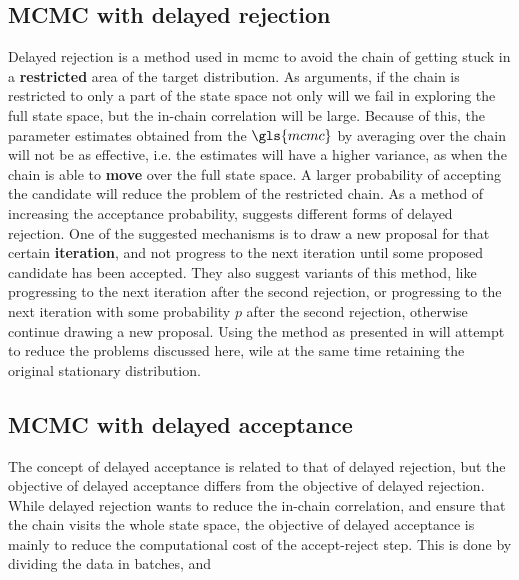 \documentclass{article}
\theoremstyle{definition}
\begin{document}
\subsection{MCMC with delayed rejection}
Delayed rejection is a method used in \gls{mcmc} to avoid the chain of getting stuck in a \textbf{restricted} area of the target distribution. As \cite{mira2001metropolis} arguments, if the chain is restricted to only a part of the state space not only will we fail in exploring the full state space, but the in-chain correlation will be large. Because of this, the parameter estimates obtained from the $\gls{mcmc}$ by averaging over the chain will not be as effective, i.e. the estimates will have a higher variance,  as when the chain is able to \textbf{move} over the full state space. A larger probability of accepting the candidate will reduce the problem of the restricted chain. As a method of increasing the acceptance probability, \cite{mira2001metropolis} suggests different forms of delayed rejection. One of the suggested mechanisms is to draw a new proposal for that certain \textbf{iteration}, and not progress to the next iteration until some proposed candidate has been accepted. They also suggest variants of this method, like progressing to the next iteration after the second rejection, or progressing to the next iteration with some probability $p$ after the second rejection, otherwise continue drawing a new proposal.  Using the method as presented in \cite{mira2001metropolis} will attempt to reduce the problems discussed here, wile at the same time retaining the original stationary distribution.  
\subsection{MCMC with delayed acceptance}
The concept of delayed acceptance is related to that of delayed rejection, but the objective of delayed acceptance differs from the objective of delayed rejection. While delayed rejection wants to reduce the in-chain correlation, and ensure that the chain visits the whole state space, the objective of delayed acceptance is mainly to reduce the computational cost of the accept-reject step.  
This is done by dividing the data in batches, and  
\end{document}
